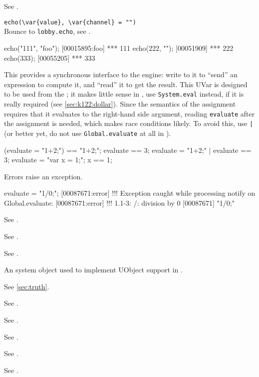 \begin{urbiscriptapi}
\item[Duration] See .

\item \lstinline|echo(\var{value}, \var{channel} = "")|\\
  Bounce to \lstinline|lobby.echo|, see .
\begin{urbiscript}
echo("111", "foo");
[00015895:foo] *** 111
echo(222, "");
[00051909] *** 222
echo(333);
[00055205] *** 333
\end{urbiscript}

\item[evaluate] This  provides a synchronous interface
  to the \urbi engine: write to it to ``send'' an expression to
  compute it, and ``read'' it to get the result.  This UVar is
  designed to be used from the \Cxx; it makes little sense in \us, use
  \lstinline|System.eval| instead, if it is really required (see
  \autoref{sec:k122:dollar}).  Since the semantics of the assignment
  requires that it evaluates to the right-hand side argument, reading
  \lstinline|evaluate| after the assignment is needed, which makes
  race conditions likely.  To avoid this, use \lstinline{|} (or better
  yet, do not use \lstinline|Global.evaluate| at all in \us).

\begin{urbiassert}
(evaluate = "1+2;") == "1+2;";
 evaluate == 3;
{ evaluate = "1+2;" | evaluate } == 3;
{ evaluate = "var x = 1;"; x } == 1;
\end{urbiassert}

  Errors raise an exception.

\begin{urbiscript}
evaluate = "1/0;";
[00087671:error] !!! Exception caught while processing notify on Global.evaluate:
[00087671:error] !!! 1.1-3: /: division by 0
[00087671] "1/0;"
\end{urbiscript}

\item[Event] See .
\item[Exception] See .
\item[Executable] See .
\item[external] An system object used to implement UObject support in
  \us.
\item[false]  See \autoref{sec:truth}.
\item[File] See .
\item[Finalizable] See .
\item[Float] See .
\item[FormatInfo] See .
\item[Formatter] See .


\end{urbiscriptapi}

